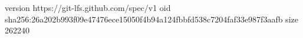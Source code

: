 version https://git-lfs.github.com/spec/v1
oid sha256:26a202b993f09e47476ece15050f4b94a124fbbfd538c7204faf33e987f3aafb
size 262240
